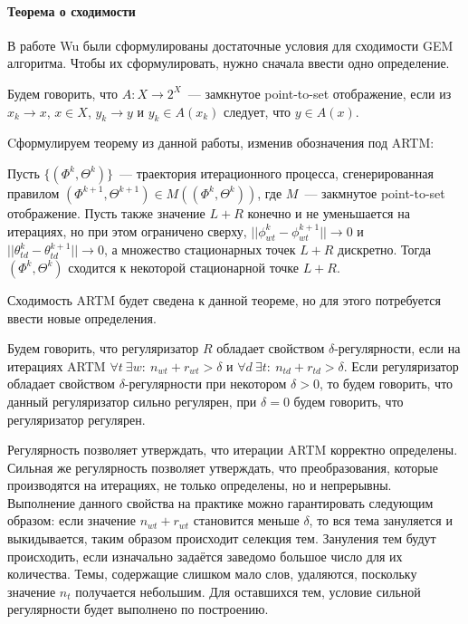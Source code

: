 \documentclass[12pt, twoside]{article}
\begin{document}
\paragraph{Теорема о сходимости}
 В работе Wu \cite{wu1983convergence} были сформулированы достаточные условия для сходимости GEM алгоритма. Чтобы их сформулировать, нужно сначала ввести одно определение.
\begin{Definition}
Будем говорить, что $A\colon X \to 2^X$~--- замкнутое point-to-set отображение, если из $x_k \to x$, $x \in X$, $y_k \to y$ и $y_k \in A(x_k)$ следует, что $y \in A(x)$.
\end{Definition}

Cформулируем теорему из данной работы, изменив обозначения под ARTM:
\begin{Theorem} \label{Theorem_wu} 
Пусть $\{(\Phi^k, \Theta^k)\}$~--- траектория итерационного процесса, сгенерированная правилом $(\Phi^{k+1}, \Theta^{k+1}) \in M((\Phi^k, \Theta^k))$, где $M$~--- закмнутое point-to-set отображение. Пусть также значение $L +  R$ конечно и не уменьшается на итерациях, но при этом ограничено сверху, $|| \phi^k_{wt} - \phi^{k+1}_{wt}|| \to 0$ и $|| \theta^k_{td} - \theta^{k+1}_{td}||\to 0$, а множество стационарных точек $L +  R$ дискретно. Тогда $(\Phi^k, \Theta^k)$ сходится к некоторой стационарной точке $L +  R$.
\end{Theorem}

Сходимость ARTM будет сведена к данной теореме, но для этого потребуется ввести новые определения.

\begin{Definition}
\label{strongreg}
Будем говорить, что регуляризатор $ R$ обладает свойством $\delta$-регулярности, если на итерациях ARTM $\forall t~\exists w \colon~n_{wt} + r_{wt} > \delta$ и $\forall d~\exists t \colon~n_{td} + r_{td} > \delta$. Если регуляризатор  обладает свойством $\delta$-регулярности при некотором $\delta > 0$, то будем говорить, что данный регуляризатор сильно регулярен, при $\delta=0$ будем говорить, что регуляризатор регулярен.
\end{Definition}

 Регулярность позволяет утверждать, что итерации ARTM корректно определены. Сильная же регулярность позволяет утверждать, что преобразования, которые производятся на итерациях, не только определены, но и непрерывны. Выполнение данного свойства на практике  можно гарантировать следующим образом: если значение $n_{wt} + r_{wt}$ становится меньше $\delta$, то вся тема зануляется  и выкидывается, таким образом происходит селекция тем. Зануления тем будут происходить, если  изначально задаётся заведомо большое число для их количества. Темы, содержащие слишком мало слов, удаляются, поскольку значение $n_t$ получается небольшим. Для оставшихся тем, условие сильной регулярности будет выполнено по построению.
 
\end{document}

